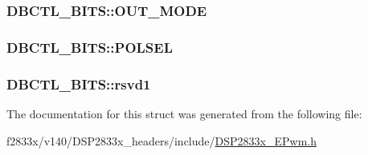 \subsubsection[{O\+U\+T\+\_\+\+M\+O\+D\+E}]{ D\+B\+C\+T\+L\+\_\+\+B\+I\+T\+S\+::\+O\+U\+T\+\_\+\+M\+O\+D\+E}\label{struct_d_b_c_t_l___b_i_t_s_ad7f97d155341f0d6795182f34dd12640}
\hypertarget{struct_d_b_c_t_l___b_i_t_s_ae2a2680efb137de1b03367e1ce428977}{}
\subsubsection[{P\+O\+L\+S\+E\+L}]{ D\+B\+C\+T\+L\+\_\+\+B\+I\+T\+S\+::\+P\+O\+L\+S\+E\+L}\label{struct_d_b_c_t_l___b_i_t_s_ae2a2680efb137de1b03367e1ce428977}
\hypertarget{struct_d_b_c_t_l___b_i_t_s_a1e8e61d0701b48cf115ecf346c366635}{}
\subsubsection[{rsvd1}]{ D\+B\+C\+T\+L\+\_\+\+B\+I\+T\+S\+::rsvd1}\label{struct_d_b_c_t_l___b_i_t_s_a1e8e61d0701b48cf115ecf346c366635}


The documentation for this struct was generated from the following file\+:\begin{DoxyCompactItemize}
\item 
f2833x/v140/\+D\+S\+P2833x\+\_\+headers/include/\hyperlink{_d_s_p2833x___e_pwm_8h}{D\+S\+P2833x\+\_\+\+E\+Pwm.\+h}\end{DoxyCompactItemize}
